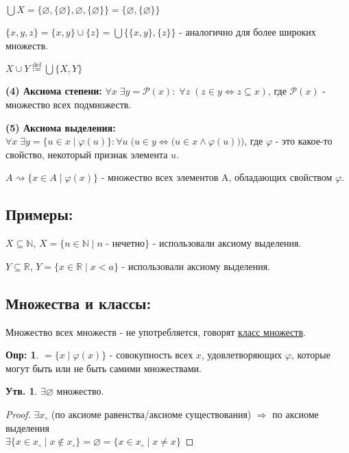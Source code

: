 \documentclass[12pt]{article}
\theoremstyle{definition}
\newtheorem{defn}{Опр:}
\newtheorem{prop}{Утв.}
\begin{document}
$\bigcup X = \big\{\varnothing,\{\varnothing\}, \varnothing,\{\varnothing\} \big\} = \big\{\varnothing,\{\varnothing\} \big\}$
	
$\{x, y, z\} = \{x, y\} \cup \{z\} = \bigcup \big\{\{x,y\}, \{z\}\big\}$ - аналогично для более широких множеств.

$X \cup Y \overset{\text{def}}{\coloneqq} \bigcup \{X, Y\}$
	
\textbf{(4) Аксиома степени:} $\forall x \; \exists y = \mathcal{P}(x) \colon \; \forall z \; (z \in y \Leftrightarrow z \subseteq x)$, где $\mathcal{P}(x)$ - множество всех подмножеств.

\textbf{(5) Аксиома выделения:} $\forall x \; \exists y = \{u \in x \mid \varphi(u)\} \colon \forall u \; \Big(u \in y \Leftrightarrow \big( u \in x \wedge \varphi(u)\big)\Big)$, где $\varphi$ - это какое-то свойство, некоторый признак элемента $u$.

$A \rightsquigarrow \{x \in A \mid \varphi(x)\}$ - множество всех элементов A, обладающих свойством $\varphi$.

\subsection*{Примеры:}

$X \subseteq \mathbb{N}$, $X = \{n \in \mathbb{N} \mid n \text{ - нечетно}\}$ - использовали аксиому выделения.

$Y \subseteq \mathbb{R}$, $Y = \{x \in \mathbb{R} \mid x < a\}$ - использовали аксиому выделения.

\subsection*{Множества и классы:}
Множество всех множеств - не употребляется, говорят \underline{класс множеств}.

\begin{defn}
	$ = \{x \mid \varphi(x)\}$ - совокупность всех $x$, удовлетворяющих $\varphi$, которые могут быть или не быть самими множествами.
\end{defn}

\begin{prop}
	$\exists \varnothing$ множество.
\end{prop}

\begin{proof}
	$\exists x_\circ$ (по аксиоме равенства/аксиоме существования) $\Rightarrow$ по аксиоме выделения\\ $\exists \{x \in x_\circ \mid x \notin x_\circ\} = \varnothing = \{x \in x_\circ \mid x \neq x\}$
\end{proof}
\end{document}
